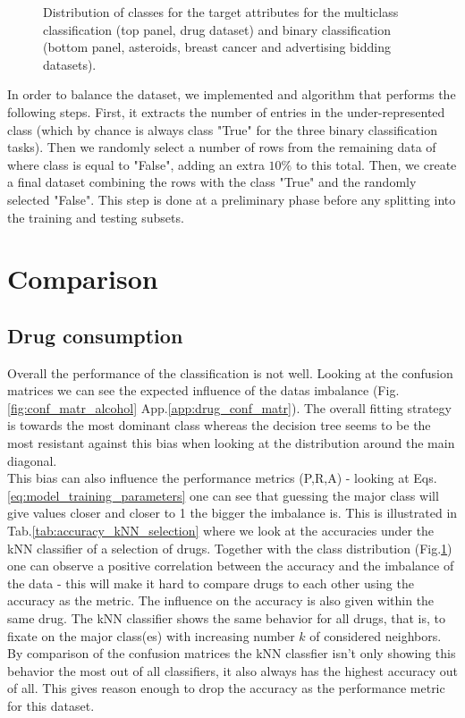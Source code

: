 \documentclass{article}
\begin{document}
\begin{figure}[h!]
\begin{minipage}[b]{0.32\textwidth}
    \end{minipage}
	\caption{Distribution of classes for the target attributes for the multiclass classification (top panel, drug dataset) and binary classification (bottom panel, asteroids, breast cancer and advertising bidding datasets).}
	\label{fig:imbalance}
\end{figure}

In order to balance the dataset, we implemented and algorithm that performs the following steps.
First, it extracts the number of entries in the under-represented class (which by chance is always class "True" for the three binary classification tasks). Then we randomly select a number of rows from the remaining data of where class is equal to "False", adding an extra $10\%$ to this total. Then, we create a final dataset combining the rows with the class "True" and the randomly selected "False".
This step is done at a preliminary phase before any splitting into the training and testing subsets.




\section{Comparison}


\subsection{Drug consumption}

Overall the performance of the classification is not well. Looking at the confusion matrices we can see the expected influence of the datas imbalance (Fig.\ref{fig:conf_matr_alcohol} App.\ref{app:drug_conf_matr}). The overall fitting strategy is towards the most dominant class whereas the decision tree seems to be the most resistant against this bias when looking at the distribution around the main diagonal. \\

This bias can also influence the performance metrics (P,R,A) - looking at Eqs.\ref{eq:model_training_parameters} one can see that guessing the major class will give values closer and closer to 1 the bigger the imbalance is. This is illustrated in Tab.\ref{tab:accuracy_kNN_selection} where we look at the accuracies under the kNN classifier of a selection of drugs. Together with the class distribution (Fig.\ref{fig:imbalance}) one can observe a positive correlation between the accuracy and the imbalance of the data - this will make it hard to compare drugs to each other using the accuracy as the metric. The influence on the accuracy is also given within the same drug. The kNN classifier shows the same behavior for all drugs, that is, to fixate on the major class(es) with increasing number $k$ of considered neighbors. By comparison of the confusion matrices the kNN classfier isn't only showing this behavior the most out of all classifiers, it also always has the highest accuracy out of all. This gives reason enough to drop the accuracy as the performance metric for this dataset. \\
\end{document}
